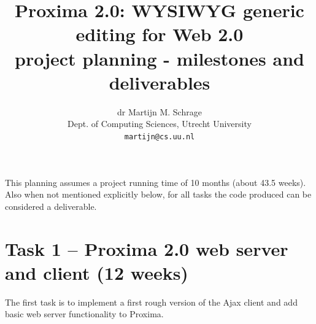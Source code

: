\documentclass[10pt]{article}
\title{Proxima 2.0: WYSIWYG generic editing for Web 2.0\\
\bigskip
        \large project planning - milestones and deliverables}
\author{dr Martijn M. Schrage\\
        \small Dept. of Computing Sciences, Utrecht University\\
        \small {\tt martijn@cs.uu.nl}
        }
\date{}
\begin{document}
\maketitle

This planning assumes a project running time of 10 months (about 43.5 weeks). Also when not mentioned explicitly below, for all tasks the code produced can be considered a deliverable.


\section*{Task 1 -- Proxima 2.0 web server and client (12 weeks)}

The first task is to implement a first rough version of the Ajax client and add basic web server functionality to Proxima.
\end{document}
